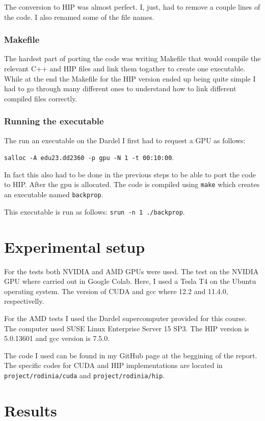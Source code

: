 \documentclass[a4paper,11pt]{scrartcl}
\begin{document}
The conversion to HIP was almost perfect. I, just, had to remove a couple lines of the code. I also renamed some of the file names.

\subsubsection*{Makefile}
The hardest part of porting the code was writing Makefile that would compile the relevant C++ and HIP files and link them togather to create one executable. While at the end the Makefile for the HIP version ended up being quite simple I had to go through many different ones to understand how to link different compiled files correctly.

\subsubsection*{Running the executable}
The run an executable on the Dardel I first had to request a GPU as follows:

\verb|salloc -A edu23.dd2360 -p gpu -N 1 -t 00:10:00|.

In fact this also had to be done in the previous steps to be able to port the code to HIP. After the gpu is allocated. The code is compiled using \verb|make| which creates an executable named \verb|backprop|.

This executable is run as follows: \verb|srun -n 1 ./backprop|.

\section{Experimental setup}
For the tests both NVIDIA and AMD GPUs were used. The test on the NVIDIA GPU where carried out in Google Colab. Here, I used a Tesla T4 on the Ubuntu operating system. The version of CUDA and gcc where 12.2 and 11.4.0, respectivelly.

For the AMD tests I used the Dardel supercomputer provided for this course. The computer used SUSE Linux Enterprise Server 15 SP3. The HIP version is 5.0.13601 and gcc version is 7.5.0.

The code I used can be found in my GitHub page at the beggining of the report. The specific codes for CUDA and HIP implementations are located in \verb|project/rodinia/cuda| and \verb|project/rodinia/hip|.

\section{Results}
\end{document}
